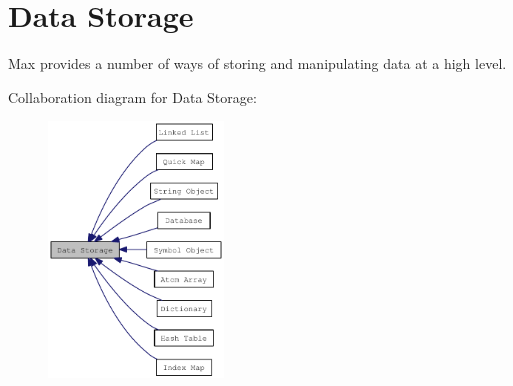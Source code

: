 \hypertarget{group__datastore}{
\section{Data Storage}
\label{group__datastore}
}


Max provides a number of ways of storing and manipulating data at a high level.  


Collaboration diagram for Data Storage:\nopagebreak
\begin{figure}[H]
\begin{center}
\leavevmode
\includegraphics[width=132pt]{group__datastore}
\end{center}
\end{figure}
